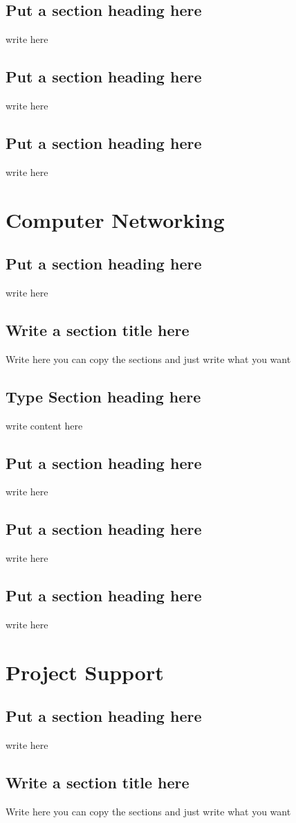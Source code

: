 \documentclass[a4paper,twoside]{scrbook}
\begin{document}
\section{Put a section heading here}
write here
\section{Put a section heading here}
write here
\section{Put a section heading here}
write here
\chapter{Computer Networking}\label{Ch10}
\section{Put a section heading here}
write here
\section{Write a section title here}
Write here you can copy the sections and just write what you want
\section{Type Section heading here}
write content here
\section{Put a section heading here}
write here
\section{Put a section heading here}
write here
\section{Put a section heading here}
write here
\chapter{Project Support}\label{ch11}
\section{Put a section heading here}
write here
\section{Write a section title here}
Write here you can copy the sections and just write what you want
\end{document}
